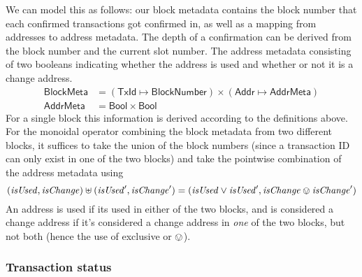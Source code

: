 \documentclass{article}
\numberwithin{equation}{lemma}
\begin{document}
We can model this as follows: our block metadata contains the block number that
each confirmed transactions got confirmed in, as well as a mapping from
addresses to address metadata. The depth of a confirmation can be derived from
the block number and the current slot number. The address metadata consisting
of two booleans indicating whether the address is used and whether or not it is
a change address.
%
\begin{align*}
\mathsf{BlockMeta} & = (\mathsf{TxId} \mapsto \mathsf{BlockNumber})
                \times (\mathsf{Addr} \mapsto \mathsf{AddrMeta}) \\
\mathsf{AddrMeta} & = \mathsf{Bool} \times \mathsf{Bool}
\end{align*}
%
For a single block this information is derived according to the definitions
above. For the monoidal operator combining the block metadata from two different
blocks, it suffices to take the union of the block numbers (since a transaction
ID can only exist in one of the two blocks) and take the pointwise combination
of the address metadata using
%
\begin{equation*}
  (\mathit{isUsed}, \mathit{isChange}) \uplus (\mathit{isUsed}', \mathit{isChange}')
= (\mathit{isUsed} \vee \mathit{isUsed}', \mathit{isChange} \ovee \mathit{isChange}')
\end{equation*}
%
An address is used if its used in either of the two blocks, and is considered
a change address if it's considered a change address in \emph{one} of the
two blocks, but not both (hence the use of exclusive or $\ovee$).

\subsubsection{Transaction status}
\label{sec:transaction_status}
\end{document}
